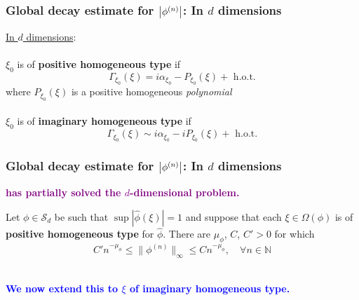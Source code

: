 \documentclass{beamer}
\theoremstyle{definition}
\begin{document}
\begin{frame}
\frametitle{Global decay estimate for $\abs{\phi^{(n)}}$: In $d$ dimensions}
\underline{In $d$ dimensions}:\\
$\,$\\

$\xi_0$ is of \textbf{positive homogeneous type} if
\begin{equation*}
\Gamma_{\xi_0}(\xi) = i\alpha_{\xi_0} - P_{\xi_0}(\xi) + \text{ h.o.t.}
\end{equation*}
where $P_{\xi_0}(\xi)$ is a positive homogeneous \textit{polynomial}\\
$\,$\\


$\xi_0$ is of \textbf{imaginary homogeneous type} if
\begin{equation*}
\Gamma_{\xi_0}(\xi) \sim i\alpha_{\xi_0} - iP_{\xi_0}(\xi)  + \text{ h.o.t.}
\end{equation*}
\end{frame}















\begin{frame}
\frametitle{Global decay estimate for $\abs{\phi^{(n)}}$: In $d$ dimensions}


\begin{center}
	\textbf{\textcolor{purple}{\cite{randles_convolution_2017} has partially solved the $d$-dimensional problem. }  }
\end{center}


\begin{theorem}\label{thm:d}
	Let $\phi \in \mathcal{S}_d$ be such that $\sup | \widehat{\phi}(\xi)| = 1$ and suppose that each $\xi \in \Omega(\phi)$ is of \textbf{positive homogeneous type} for $\widehat{\phi}$. There are $\mu_\phi$, $C$, $C' >0$ for which 
	\begin{equation*}
	C'n^{-\mu_\phi} \leq \| \phi^{(n)} \|_\infty \leq C n^{-\mu_\phi}, \quad \forall n\in \mathbb{N}
	\end{equation*}
\end{theorem}
$\,$\\

\centering\textcolor{blue}{\textbf{We now extend this to $\xi$ of imaginary homogeneous type.}}


\end{frame}
\end{document}
